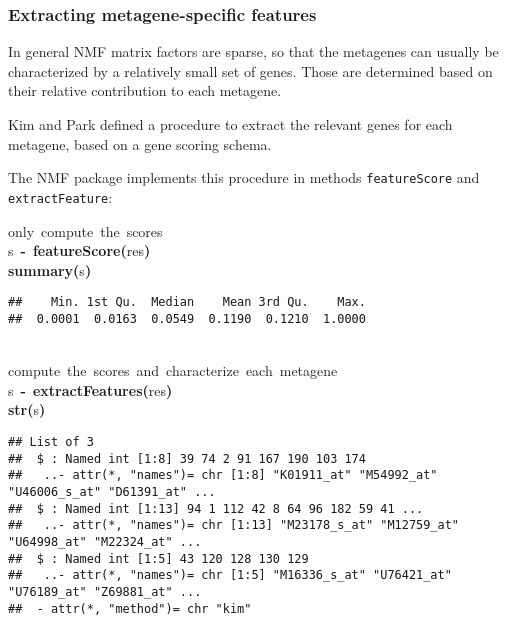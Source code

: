 \documentclass[a4paper]{article}\usepackage{graphicx, color}
\makeatletter
\newcommand{\hlfunctioncall}[1]{\textcolor[rgb]{0.501960784313725,0,0.329411764705882}{\textbf{#1}}}%
\newcommand{\hlkeyword}[1]{\textcolor[rgb]{0,0,0}{\textbf{#1}}}%
\newcommand{\hlcomment}[1]{\textcolor[rgb]{0.180392156862745,0.6,0.341176470588235}{#1}}%
\newcommand{\hlassignement}[1]{\textcolor[rgb]{0,0,0}{\textbf{#1}}}%
\newcommand{\hlsymbol}[1]{\textcolor[rgb]{0,0,0}{#1}}%
\newcommand{\hlstd}[1]{\textcolor[rgb]{0,0,0}{#1}}%
\newenvironment{kframe}{%
 \def\FrameCommand##1{\hskip\@totalleftmargin \hskip-\fboxsep
 \colorbox{shadecolor}{##1}\hskip-\fboxsep
     \hskip-\linewidth \hskip-\@totalleftmargin \hskip\columnwidth}%
 \MakeFramed {\advance\hsize-\width
   \@totalleftmargin\z@ \linewidth\hsize
   \@setminipage}}%
 {\par\unskip\endMakeFramed}
\newenvironment{knitrout}{}{} %
\let\code=\texttt
\makeatother
\begin{document}
\subsubsection{Extracting metagene-specific features}

In general NMF matrix factors are sparse, so that the metagenes can usually be characterized by a relatively small set of genes. Those are determined based on 
their relative contribution to each metagene.

Kim and Park \cite{KimH2007} defined a procedure to extract the relevant genes for each metagene, based on a gene scoring schema.

The NMF package implements this procedure in methods \code{featureScore} and \code{extractFeature}:

\begin{knitrout}
\color{fgcolor}\begin{kframe}
\begin{flushleft}
\ttfamily\noindent
\hlcomment{\usebox{\hlnormalsizeboxhash}{\ }only{\ }compute{\ }the{\ }scores}\hspace*{\fill}\\
\hlstd{}\hlsymbol{s}{\ }\hlassignement{\usebox{\hlnormalsizeboxlessthan}-}{\ }\hlfunctioncall{featureScore}\hlkeyword{(}\hlsymbol{res}\hlkeyword{)}\hspace*{\fill}\\
\hlstd{}\hlfunctioncall{summary}\hlkeyword{(}\hlsymbol{s}\hlkeyword{)}\mbox{}
\normalfont
\end{flushleft}
\begin{verbatim}
##    Min. 1st Qu.  Median    Mean 3rd Qu.    Max. 
##  0.0001  0.0163  0.0549  0.1190  0.1210  1.0000 
\end{verbatim}
\begin{flushleft}
\ttfamily\noindent
\hspace*{\fill}\\
\hlstd{}\hlcomment{\usebox{\hlnormalsizeboxhash}{\ }compute{\ }the{\ }scores{\ }and{\ }characterize{\ }each{\ }metagene}\hspace*{\fill}\\
\hlstd{}\hlsymbol{s}{\ }\hlassignement{\usebox{\hlnormalsizeboxlessthan}-}{\ }\hlfunctioncall{extractFeatures}\hlkeyword{(}\hlsymbol{res}\hlkeyword{)}\hspace*{\fill}\\
\hlstd{}\hlfunctioncall{str}\hlkeyword{(}\hlsymbol{s}\hlkeyword{)}\mbox{}
\normalfont
\end{flushleft}
\begin{verbatim}
## List of 3
##  $ : Named int [1:8] 39 74 2 91 167 190 103 174
##   ..- attr(*, "names")= chr [1:8] "K01911_at" "M54992_at" "U46006_s_at" "D61391_at" ...
##  $ : Named int [1:13] 94 1 112 42 8 64 96 182 59 41 ...
##   ..- attr(*, "names")= chr [1:13] "M23178_s_at" "M12759_at" "U64998_at" "M22324_at" ...
##  $ : Named int [1:5] 43 120 128 130 129
##   ..- attr(*, "names")= chr [1:5] "M16336_s_at" "U76421_at" "U76189_at" "Z69881_at" ...
##  - attr(*, "method")= chr "kim"
\end{verbatim}
\end{kframe}
\end{knitrout}
\end{document}
